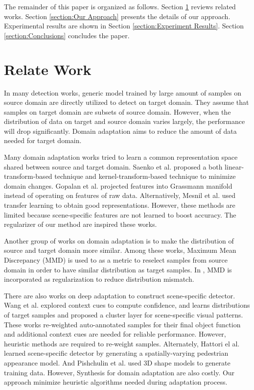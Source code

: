 \documentclass[runningheads]{llncs}
\begin{document}
The remainder of this paper is organized as follows. Section \ref{section:Relate Work} reviews related works. Section \ref{section:Our Approach} presents the details of our approach. Experimental results are shown in Section \ref{section:Experiment Results}. Section \ref{section:Conclusions} concludes the paper.

\section{Relate Work}
\label{section:Relate Work}

In many detection works, generic model trained by large amount of samples on source domain are directly utilized to detect on target domain. They assume that samples on target domain are subsets of source domain. However, when the distribution of data on target and source domain varies largely, the performance will drop significantly. Domain adaptation aims to reduce the amount of data needed for target domain.

Many domain adaptation works tried to learn a common representation space shared between source and target domain. Saenko et al. \cite{saenko2010adapting,kulis2011you} proposed a both linear-transform-based technique and kernel-transform-based technique to minimize domain changes. Gopalan et al. \cite{gopalan2011domain} projected features into Grassmann manifold instead of operating on features of raw data. Alternatively, Mesnil et al. \cite{mesnil2012unsupervised} used transfer learning to obtain good representations. However, these methods are limited because scene-specific features are not learned to boost accuracy. The regularizer of our method are inspired these works.

Another group of works \cite{huang2006correcting,gretton2009covariate,gong2013connecting} on domain adaptation is to make the distribution of source and target domain more similar. Among these works, Maximum Mean Discrepancy (MMD) is used to as a metric to reselect samples from source domain in order to have similar distribution as target samples. In \cite{ghifary2014domain}, MMD is incorporated as regularization to reduce distribution mismatch.

There are also works on deep adaptation to construct scene-specific detector. Wang et al.\cite{wang2014scene} explored context cues to compute confidence, and \cite{zeng2014deep} learns distributions of target samples and proposed a cluster layer for scene-specific visual patterns. These works re-weighted auto-annotated samples for their final object function and additional context cues are needed for reliable performance. However, heuristic methods are required to re-weight samples. Alternately, Hattori el al. \cite{hattori2015learning} learned scene-specific detector by generating a spatially-varying pedestrian appearance model. And Pishchulin et al. \cite{pishchulin2011learning} used 3D shape models to generate training data. However, Synthesis for domain adaptation are also costly. Our approach minimize heuristic algorithms needed during adaptation process.
\end{document}
